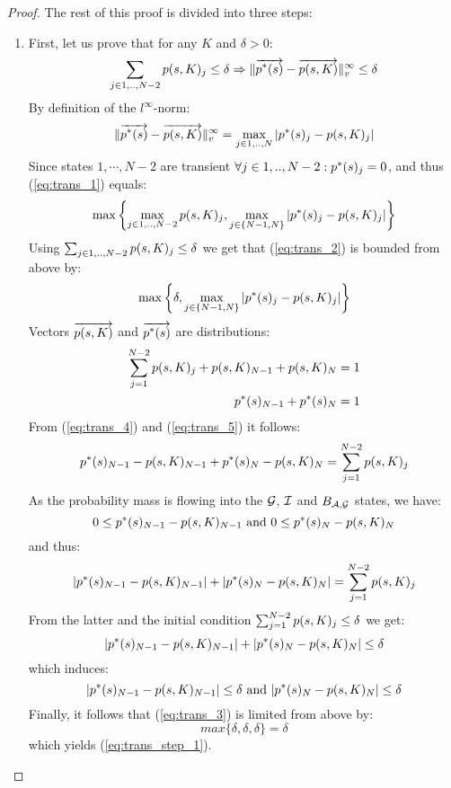 \documentclass{entcs}
\begin{document}
{\begin{proof}
				The rest of this proof is divided into three steps:
				\begin{enumerate}
					\item First, let us prove that for any $K$ and $\delta > 0$:
						\begin{equation}
							\sum_{j \in 1,..,N-2} p(s,K)_{j} \leq \delta \Rightarrow \lVert  \overrightarrow{p^{*}(s)} - \overrightarrow{p(s,K)}  \rVert_{v}^{\infty} \leq \delta
							\label{eq:trans_step_1}
						\end{equation}
						By definition of the $l^{\infty}$-norm:
						\begin{equation}
							\lVert  \overrightarrow{p^{*}(s)} - \overrightarrow{p(s,K)}  \rVert_{v}^{\infty} = \max_{j \in 1,..,N} | p^{*}(s)_{j} - p(s,K)_{j} | \label{eq:trans_1}
						\end{equation}
						Since states $1,\cdots,N-2$ are transient $\forall j \in 1,..,N-2 : p^{*}(s)_{j} =0 $, and thus (\ref{eq:trans_1}) equals:
						\begin{equation}
							\max \left\{ \max_{j \in 1,..,N-2} p(s,K)_{j}, \max_{j \in \{N-1,N \} } | p^{*}(s)_{j} - p(s,K)_{j} | \right\} \label{eq:trans_2}
						\end{equation}
						Using $\sum_{j \in 1,..,N-2} p(s,K)_{j} \leq \delta$ we get that (\ref{eq:trans_2}) is bounded from above by:
						\begin{equation}
							\max \left\{ \delta, \max_{ j \in \{N-1,N \} } | p^{*}(s)_{j} - p(s,K)_{j} | \right\} \label{eq:trans_3}
						\end{equation}
						Vectors $\overrightarrow{p(s,K)}$ and $\overrightarrow{p^{*}(s)}$ are distributions:
						\begin{eqnarray}
							\sum_{j=1}^{N-2} p(s,K)_{j} + p(s,K)_{N{-}1} + p(s,K)_{N} = 1 \label{eq:trans_4} \\
							p^{*}(s)_{N{-}1} + p^{*}(s)_{N} = 1 \label{eq:trans_5}
						\end{eqnarray}
						From (\ref{eq:trans_4}) and (\ref{eq:trans_5}) it follows:
						\[
							p^{*}(s)_{N{-}1} - p(s,K)_{N{-}1} + p^{*}(s)_{N} - p(s,K)_{N} = \sum_{j=1}^{N-2} p(s,K)_{j}
						\]
						As the probability mass is flowing into the $\mathcal{G}$, $\mathcal{I}$ and $B_{ \mathcal{A}, \mathcal{G} }$ states, we have:
						\begin{equation}
							0 \leq p^{*}(s)_{N{-}1} - p(s,K)_{N{-}1} \text{ and } 0 \leq p^{*}(s)_{N} - p(s,K)_{N} \nonumber
						\end{equation}
						and thus:
						\[
							|p^{*}(s)_{N{-}1} - p(s,K)_{N{-}1}| + |p^{*}(s)_{N} - p(s,K)_{N}| = \sum_{j=1}^{N-2} p(s,K)_{j}
						\]
						From the latter and the initial condition $\sum_{j=1}^{N-2} p(s,K)_{j} \leq \delta$ we get:
						\[
							|p^{*}(s)_{N{-}1} - p(s,K)_{N{-}1}| + |p^{*}(s)_{N} - p(s,K)_{N}| \leq \delta
						\]
						which induces:
						\[
							| p^{*}(s)_{N{-}1}- p(s,K)_{N{-}1} | \leq \delta \text{ and } | p^{*}(s)_{N} - p(s,K)_{N} | \leq \delta
						\]
						Finally, it follows that (\ref{eq:trans_3}) is limited from above by:
						\[
							max \{ \delta, \delta, \delta \} = \delta
						\]
						which yields (\ref{eq:trans_step_1}).
				

\end{enumerate}
\end{proof}}
\end{document}

